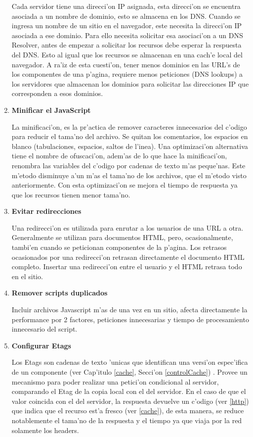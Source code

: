 \begin{enumerate}
Cada servidor tiene una direcci'on IP asignada, esta direcci'on se encuentra asociada a un nombre de dominio, esto se almacena en los DNS. Cuando se ingresa un nombre de un sitio en el navegador, este necesita la direcci'on IP asociada a ese dominio. Para ello necesita solicitar esa asociaci'on a un DNS Resolver, antes de empezar a solicitar los recursos debe esperar la respuesta del DNS. Esto al igual que los recursos se almacenan en una cach'e local del navegador. A ra'iz de esta cuesti'on, tener menos dominios en las URL's de los componentes de una p'agina, requiere menos peticiones (DNS lookups) a los servidores que almacenan los dominios para solicitar las direcciones IP que corresponden a esos dominios.
\item \textbf{Minificar el JavaScript}

La minificaci'on, es la pr'actica de remover caracteres innecesarios del c'odigo para reducir el tama'no del archivo. Se quitan los comentarios, los espacios en blanco (tabulaciones, espacios, saltos de l'inea). Una optimizaci'on alternativa tiene el nombre de ofuscaci'on, adem'as de lo que hace la minificaci'on, renombra las variables del c'odigo por cadenas de texto m'as peque'nas. Este m'etodo disminuye a'un m'as el tama'no de los archivos, que el m'etodo visto anteriormente.
Con esta optimizaci'on se mejora el tiempo de respuesta ya que los recursos tienen menor tama'no.
\item \textbf{Evitar redirecciones}

Una redirecci'on es utilizada para enrutar a los usuarios de una URL a otra. Generalmente se utilizan para documentos HTML, pero, ocasionalmente, tambi'en cuando se peticionan componentes de la p'agina. Los retrasos ocasionados por una redirecci'on retrasan directamente el documento HTML completo. Insertar una redirecci'on entre el usuario y el HTML retrasa todo en el sitio.
\item \textbf{Remover scripts duplicados}

Incluir archivos Javascript m'as de una vez en un sitio, afecta directamente la performance por 2 factores, peticiones innecesarias y tiempo de procesamiento innecesario del script.
\item \textbf{Configurar Etags}

Los Etags son cadenas de texto 'unicas que identifican una versi'on espec'ifica de un componente (ver Cap'itulo \ref{cache}, Secci'on \ref{controlCache}) . Provee un mecanismo para poder realizar una petici'on condicional al servidor, comparando el Etag de la copia local con el del servidor. En el caso de que el valor coincida con el del servidor, la respuesta devuelve un c'odigo (ver \ref{http}) que indica que el recurso est'a fresco (ver \ref{cache}), de esta manera, se reduce notablemente el tama'no de la respuesta y el tiempo ya que viaja por la red solamente los headers.


\end{enumerate}
